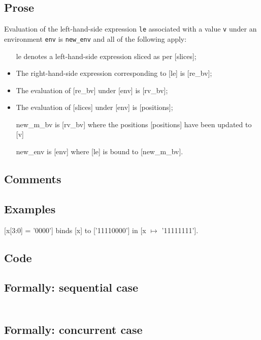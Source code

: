 \documentclass{book}
\begin{document}
    \subsection{Prose}
    Evaluation of the left-hand-side expression \texttt{le} associated with a
value \texttt{v} under an environment \texttt{env} is \texttt{new\_env} and all
of the following apply:
    \begin{itemize}
    \item [le] denotes a left-hand-side expression sliced as per [slices];
    \item The right-hand-side expression corresponding to [le] is [re\_bv];
    \item The evaluation of [re\_bv] under [env] is [rv\_bv];
    \item The evaluation of [slices] under [env] is [positions];
    \item [new\_m\_bv] is [rv\_bv] where the positions [positions] have been updated to [v]
    \item [new\_env] is [env] where [le] is bound to [new\_m\_bv].
    \end{itemize}

   \subsection{Comments}

   \subsection{Examples}
   [x[3:0] = '0000'] binds [x] to ['11110000'] in [x $\mapsto$ '11111111'].

  \subsection{Code}

  \subsection{Formally: sequential case}
  \begin{align}
  \end{align} 

  \subsection{Formally: concurrent case}
  \begin{align}
  \end{align} 
\end{document}

